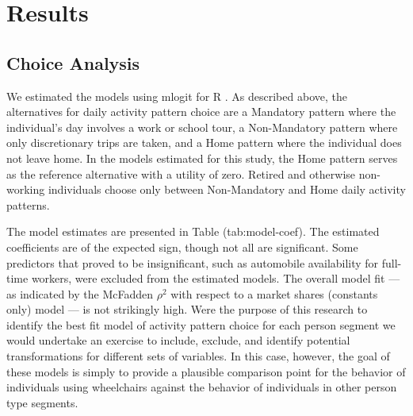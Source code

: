 \documentclass[3p, authoryear, review]{elsarticle} %
\begin{document}
\hypertarget{results}{%
\section{Results}\label{results}}

\hypertarget{choice-analysis}{%
\subsection{Choice Analysis}\label{choice-analysis}}

We estimated the models using mlogit for R \cite{R, mlogit}. As described above, the
alternatives for daily activity pattern choice are a Mandatory pattern where the
individual's day involves a work or school tour, a Non-Mandatory pattern where
only discretionary trips are taken, and a Home pattern where the individual does
not leave home. In the models estimated for this study, the Home pattern serves
as the reference alternative with a utility of zero. Retired and otherwise
non-working individuals choose only between Non-Mandatory and Home daily activity
patterns.

The model estimates are presented in
Table \citet{ref}(tab:model-coef).
The estimated coefficients are of the expected sign, though not all are significant.
Some predictors that proved to be insignificant, such as automobile availability
for full-time workers, were excluded from the estimated models.
The overall model fit --- as indicated by the McFadden \(\rho^2\) with respect to
a market shares (constants only) model --- is not strikingly high. Were the purpose
of this research to identify the best fit model of activity pattern choice for
each person segment we would undertake an exercise to include, exclude, and identify
potential transformations for different sets of variables. In this case, however,
the goal of these models is simply to provide a plausible comparison point for
the behavior of individuals using wheelchairs against the behavior of individuals
in other person type segments.
\end{document}
